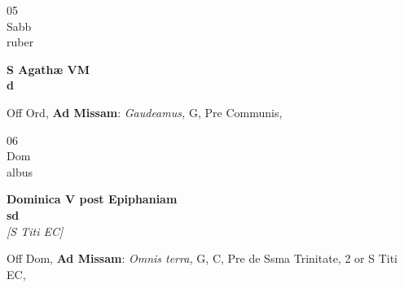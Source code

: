 \documentclass[10pt, openany]{book}
\begin{document}
        \begin{center}
            \begin{minipage}{3.5in}
                \vspace{2em}
                \begin{minipage}{0.5in}
                    {\Huge 05} \\
                    {\normalsize Sabb} \\
                    {\normalsize ruber}
                \end{minipage}
                \begin{minipage}{3.0in}
                    \textbf{ \large S Agathæ VM \\
                    \textnormal{\normalsize d}} \\ 
                \end{minipage}
                \begin{justify}Off Ord, \textbf{Ad Missam}: \textit{Gaudeamus,} G, Pre Communis,   
                \end{justify}
            \end{minipage}
        \end{center}
    
        \begin{center}
            \begin{minipage}{3.5in}
                \vspace{2em}
                \begin{minipage}{0.5in}
                    {\Huge 06} \\
                    {\normalsize Dom} \\
                    {\normalsize albus}
                \end{minipage}
                \begin{minipage}{3.0in}
                    \textbf{ \large Dominica V post Epiphaniam \\
                    \textnormal{\normalsize sd}} \\ \textit{[S Titi EC]} \\ 
                \end{minipage}
                \begin{justify}Off Dom, \textbf{Ad Missam}: \textit{Omnis terra,} G, C, Pre de Ssma Trinitate, 2 or S Titi EC,   
                \end{justify}
            \end{minipage}
        \end{center}
    
\end{document}
